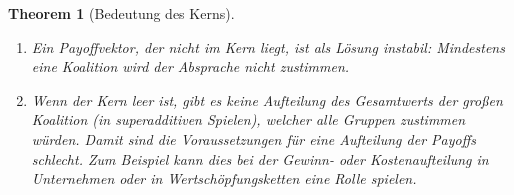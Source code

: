 \documentclass[12pt]{extreport} %
\theoremstyle{named}
\newtheorem{unnamedtheorem}{Theorem} \counterwithin{unnamedtheorem}{chapter}
\theoremstyle{itshape}
\theoremstyle{normal}
\begin{document}
\begin{unnamedtheorem}[Bedeutung des Kerns] ~\
	\begin{enumerate}
		\item Ein Payoffvektor, der nicht im Kern liegt, ist als Lösung instabil: Mindestens eine Koalition wird der Absprache nicht zustimmen.
		\item Wenn der Kern leer ist, gibt es keine Aufteilung des Gesamtwerts der großen Koalition (in superadditiven Spielen), welcher alle Gruppen zustimmen würden. Damit sind die Voraussetzungen für eine Aufteilung der Payoffs schlecht. Zum Beispiel kann dies bei der Gewinn- oder Kostenaufteilung in Unternehmen oder in Wertschöpfungsketten eine Rolle spielen.
	\end{enumerate} 
\end{unnamedtheorem}
 
\end{document}
